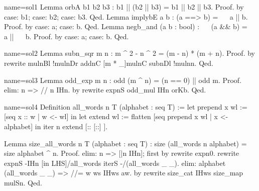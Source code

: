 \begin{Answer}[ref=ex:boolid]

\begin{coq}{name=sol1}{}
Lemma orbA b1 b2 b3 : b1 || (b2 || b3) = b1 || b2 || b3.
Proof. by case: b1; case: b2; case: b3. Qed.
Lemma implybE a b : (a ==> b) = ~~ a || b.
Proof. by case: a; case: b. Qed.
Lemma negb_and (a b : bool) : ~~ (a && b) = ~~ a || ~~ b.
Proof. by case: a; case: b. Qed.
\end{coq}
\end{Answer}

\begin{Answer}[ref=ex:rewrite]

\begin{coq}{name=sol2}{}
Lemma subn_sqr m n : m ^ 2 - n ^ 2 = (m - n) * (m + n).
Proof. by rewrite mulnBl !mulnDr addnC [m * _]mulnC subnDl !mulnn. Qed.
\end{coq}
\end{Answer}

\begin{Answer}[ref=ex:induction]

\begin{coq}{name=sol3}{}
Lemma odd_exp m n : odd (m ^ n) = (n == 0) || odd m.
Proof.
elim: n => // n IHn.
by rewrite expnS odd_mul {}IHn orKb.
Qed.
\end{coq}
\end{Answer}

\begin{Answer}[ref=ex:induction2]

\begin{coq}{name=sol4}{}
Definition all_words n T (alphabet : seq T) :=
  let prepend x wl := [seq x :: w | w <- wl] in
  let extend wl := flatten [seq prepend x wl | x <- alphabet] in
  iter n extend [:: [::] ].

Lemma size_all_words n T (alphabet : seq T) :
  size (all_words n alphabet) = size alphabet ^ n.
Proof.
elim: n => [|n IHn]; first by rewrite expn0.
rewrite expnS -{}IHn [in LHS]/all_words iterS -/(all_words _ _).
elim: alphabet (all_words _ _) => //= w ws IHws aw.
by rewrite size_cat IHws size_map mulSn.
Qed.
\end{coq}
\end{Answer}







